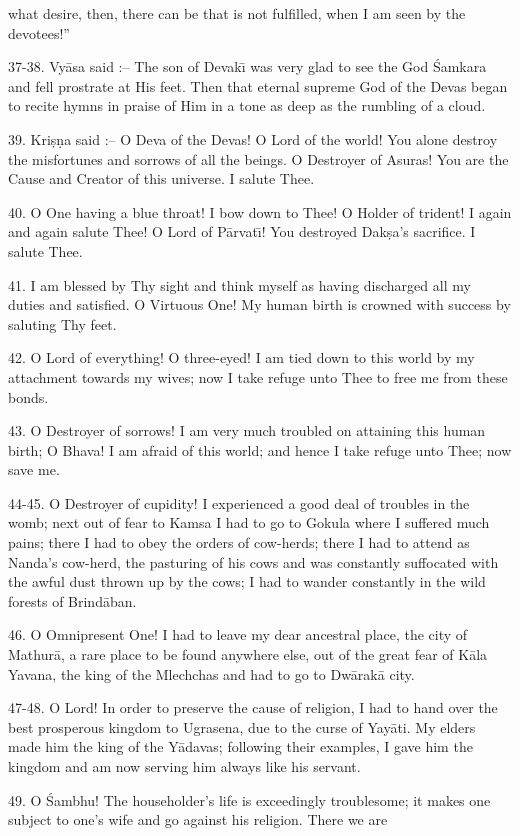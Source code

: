 what desire, then, there can be that is not fulfilled, when I am seen by the devotees!''

37-38. Vy\=asa said :-- The son of Devak\={\i} was very glad to see the God \'Samkara and fell prostrate at His feet. Then that eternal supreme God of the Devas began to recite hymns in praise of Him in a tone as deep as the rumbling of a cloud.

39. Kri\d{s}\d{n}a said :-- O Deva of the Devas! O Lord of the world! You alone destroy the misfortunes and sorrows of all the beings. O Destroyer of Asuras! You are the Cause and Creator of this universe. I salute Thee.

40. O One having a blue throat! I bow down to Thee! O Holder of trident! I again and again salute Thee! O Lord of P\=arvat\={\i}! You destroyed Dak\d{s}a's sacrifice. I salute Thee.

41. I am blessed by Thy sight and think myself as having discharged all my duties and satisfied. O Virtuous One! My human birth is crowned with success by saluting Thy feet.

42. O Lord of everything! O three-eyed! I am tied down to this world by my attachment towards my wives; now I take refuge unto Thee to free me from these bonds.

43. O Destroyer of sorrows! I am very much troubled on attaining this human birth; O Bhava! I am afraid of this world; and hence I take refuge unto Thee; now save me.

44-45. O Destroyer of cupidity! I experienced a good deal of troubles in the womb; next out of fear to Kamsa I had to go to Gokula where I suffered much pains; there I had to obey the orders of cow-herds; there I had to attend as Nanda's cow-herd, the pasturing of his cows and was constantly suffocated with the awful dust thrown up by the cows; I had to wander constantly in the wild forests of Brind\=aban.

46. O Omnipresent One! I had to leave my dear ancestral place, the city of Mathur\=a, a rare place to be found anywhere else, out of the great fear of K\=ala Yavana, the king of the Mlechchas and had to go to Dw\=arak\=a city.

47-48. O Lord! In order to preserve the cause of religion, I had to hand over the best prosperous kingdom to Ugrasena, due to the curse of Yay\=ati. My elders made him the king of the Y\=adavas; following their examples, I gave him the kingdom and am now serving him always like his servant.

49. O \'Sambhu! The householder's life is exceedingly troublesome; it makes one subject to one's wife and go against his religion. There we are

